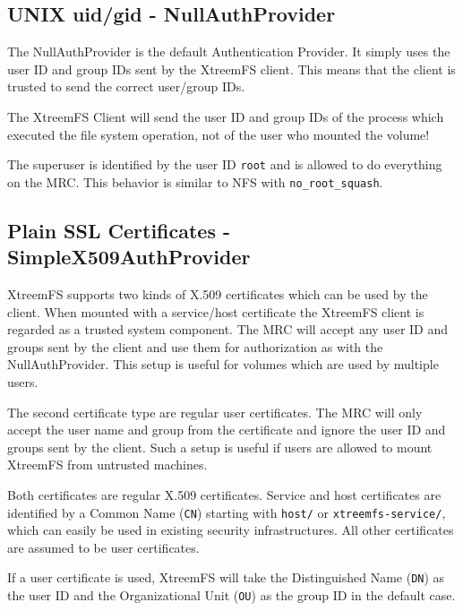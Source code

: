 \documentclass[a4paper,10pt]{book}
\begin{document}
\subsection{UNIX uid/gid - NullAuthProvider}

The NullAuthProvider is the default Authentication Provider. It simply uses the user ID and group IDs sent by the XtreemFS client. This means that the client is trusted to send the correct user/group IDs.

The XtreemFS Client will send the user ID and group IDs of the process which executed the file system operation, not of the user who mounted the volume!

The superuser is identified by the user ID \texttt{root} and is allowed to do everything on the MRC. This behavior is similar to NFS with \texttt{no\_root\_squash}.

\subsection{Plain SSL Certificates - SimpleX509AuthProvider}
\label{sec:simple_x509_auth_provider}

XtreemFS supports two kinds of X.509 certificates which can be used by the client. When mounted with a service/host certificate the XtreemFS client is regarded as a trusted system component. The MRC will accept any user ID and groups sent by the client and use them for authorization as with the NullAuthProvider. This setup is useful for volumes which are used by multiple users.

The second certificate type are regular user certificates. The MRC will only accept the user name and group from the certificate and ignore the user ID and groups sent by the client. Such a setup is useful if users are allowed to mount XtreemFS from untrusted machines.

Both certificates are regular X.509 certificates. Service and host certificates are identified by a Common Name (\texttt{CN}) starting with \texttt{host/} or \texttt{xtreemfs-service/}, which can easily be used in existing security infrastructures. All other certificates are assumed to be user certificates.

If a user certificate is used, XtreemFS will take the Distinguished Name (\texttt{DN}) as the user ID and the Organizational Unit (\texttt{OU}) as the group ID in the default case.
\end{document}
